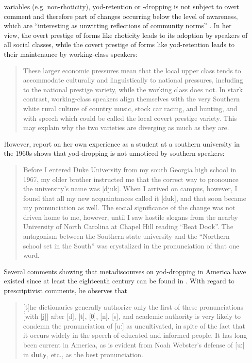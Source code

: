 variables (e.g. non-rhoticity), yod-retention or -dropping is not subject to overt comment and therefore part of changes occurring below the level of awareness, which are “interesting as unwitting reflections of community norms” \citep[363]{Feagin2015}. In her view, the overt prestige of forms like rhoticity leads to its adoption by speakers of all social classes, while the covert prestige of forms like yod-retention leads to their maintenance by working-class speakers:

\begin{quote}
These larger economic pressures mean that the local upper class tends to accommodate culturally and linguistically to national pressures, including to the national prestige variety, while the working class does not. In stark contrast, working-class speakers align themselves with the very Southern white rural culture of country music, stock car racing, and hunting, and with speech which could be called the local covert prestige variety. This may explain why the two varieties are diverging as much as they are. \citep[364]{Feagin2015}
\end{quote}


However,  report on her own experience as a student at a southern university in the 1960s shows that yod-dropping is not unnoticed by southern speakers:


\begin{quote}
Before I entered Duke University from my south Georgia high school in 1967, my older brother instructed me that the correct way to pronounce the university’s name was [djuk]. When I arrived on campus, however, I found that all my new acquaintances called it [duk], and that soon became my pronunciation as well. The social significance of the change was not driven home to me, however, until I saw hostile slogans from the nearby University of North Carolina at Chapel Hill reading “Beat Dook”. The antagonism between the Southern state university and the “Northern school set in the South” was crystalized in the pronunciation of that one word.
\end{quote}


Several comments showing that metadiscourses on yod-dropping in America have existed since at least the eighteenth century can be found in \citet{Krapp1919, Krapp19251, Krapp19252}. With regard to prescriptivist comments, he observes that


\begin{quote}
[t]he dictionaries generally authorize only the first of these pronunciations [with [j]] after [d], [t], [θ], [n], [s], and academic authority is very likely to condemn the pronunciation of [uː] as uncultivated, in spite of the fact that it occurs widely in the speech of educated and informed people. It has long been current in America, as is evident from Noah Webster’s defense of [uː] in \textbf{duty}, etc., as the best pronunciation. \citep[95--96]{Krapp1919}
\end{quote}



